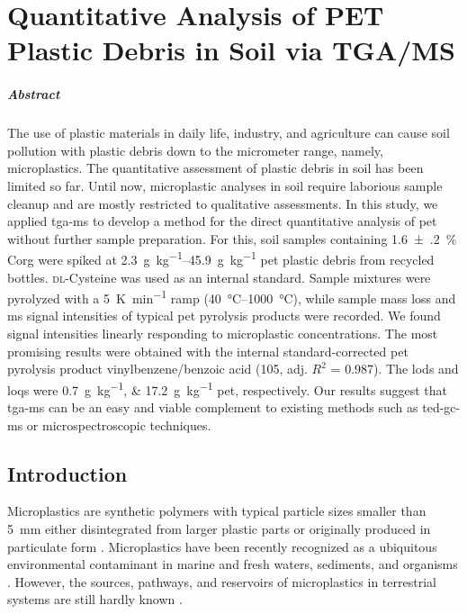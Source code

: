 
\chapter{Quantitative Analysis of PET Plastic Debris in Soil via TGA/MS}
\label{ch:tga-ms-method}

\paragraph{Abstract} The use of plastic materials in daily life, industry, and agriculture can cause soil pollution with plastic debris down to the micrometer range, namely, microplastics.
The quantitative assessment of plastic debris in soil has been limited so far. Until now, microplastic analyses in soil require laborious sample cleanup and are mostly restricted to qualitative assessments. In this study, we applied \ac{tga-ms} to develop a method for the direct quantitative analysis of \ac{pet} without further sample preparation.
For this, soil samples containing \SI{1.6(2)}{\percent} \ac{Corg} were spiked at \SIrange{2.3}{45.9}{\gram\per\kilo\gram} \ac{pet} plastic debris from recycled bottles. \textsc{dl}-Cysteine was used as an internal standard. Sample mixtures were pyrolyzed with a \SI{5}{\kelvin\per\minute} ramp (\SIrange{40}{1000}{\degreeCelsius}), while sample mass loss and \ac{ms} signal intensities of typical \ac{pet} pyrolysis products were recorded.
We found signal intensities linearly responding to microplastic concentrations. The most promising results were obtained with the internal standard-corrected \ac{pet} pyrolysis product vinylbenzene\slash benzoic acid (\SI{105}{\mz}, adj. $R^2$ = \num{0.987}). The \acp{lod} and \acp{loq} were \SIlist{0.7;17.2}{\gram\per\kilo\gram} \ac{pet}, respectively.
Our results suggest that \ac{tga-ms} can be an easy and viable complement to existing methods such as \ac{ted-gc-ms} or microspectroscopic techniques.

\section{Introduction}

Microplastics are synthetic polymers with typical particle sizes smaller than \SI{5}{\milli\meter} either disintegrated from larger plastic parts or originally produced in particulate form \citep{CincinelliMicroplastic2017}.
Microplastics have been recently recognized as a ubiquitous environmental contaminant in marine and fresh waters, sediments, and organisms \citep{KarlssonScreening2017,RochmanMicroplastics2018}. However, the sources, pathways, and reservoirs of microplastics in terrestrial systems are still hardly known \citep{DrisSynthetic2016}.

